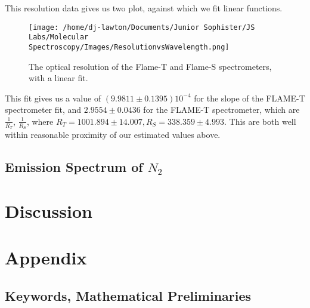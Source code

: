 \documentclass{article}
\begin{document}
This resolution data gives us two plot, against which we fit linear functions.
\begin{figure}[H]
    \centering
    \texttt{[image: /home/dj-lawton/Documents/Junior Sophister/JS Labs/Molecular Spectroscopy/Images/ResolutionvsWavelength.png]}
    \caption{\label{fig:Resolution} The optical resolution of the Flame-T and Flame-S spectrometers, with a linear fit.}
\end{figure}
This fit gives us a value of $(9.9811\pm0.1395)10^{-4}$ for the slope of the FLAME-T spectrometer fit, and $2.9554\pm0.0436$ for the FLAME-T spectrometer, which are $\frac{1}{R_T}$, $\frac{1}{R_S}$, where $R_T = 1001.894\pm14.007, R_S = 338.359\pm4.993$. This are both well within reasonable proximity of our estimated values above.\\
\subsection{Emission Spectrum of $N_2$}
\section{Discussion}
\newpage
\section{Appendix}

\subsection{Keywords, Mathematical Preliminaries}
\end{document}

